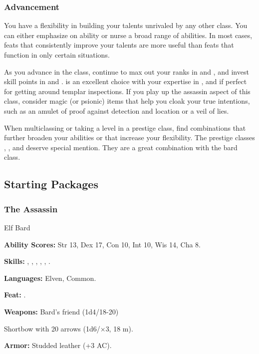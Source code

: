\subsubsection{Advancement}
You have a flexibility in building your talents unrivaled by any other class. You can either emphasize on ability or nurse a broad range of abilities. In most cases, feats that consistently improve your talents are more useful than feats that function in only certain situations.

As you advance in the class, continue to max out your ranks in  and , and invest skill points in  and .  is an excellent choice with your expertise in , and  if perfect for getting around templar inspections. If you play up the assassin aspect of this class, consider magic (or psionic) items that help you cloak your true intentions, such as an amulet of proof against detection and location or a veil of lies.

When multiclassing or taking a level in a prestige class, find combinations that further broaden your abilities or that increase your flexibility. The prestige classes , , and  deserve special mention. They are a great combination with the bard class.


\subsection{Starting Packages}
\subsubsection{The Assassin}
Elf Bard

\textbf{Ability Scores:} Str 13, Dex 17, Con 10, Int 10, Wis 14, Cha 8.

\textbf{Skills:} , , , , , .

\textbf{Languages:} Elven, Common.

\textbf{Feat:} .

\textbf{Weapons:} Bard's friend (1d4/18-20)

Shortbow with 20 arrows (1d6/$\times$3, 18 m).

\textbf{Armor:} Studded leather (+3 AC).

